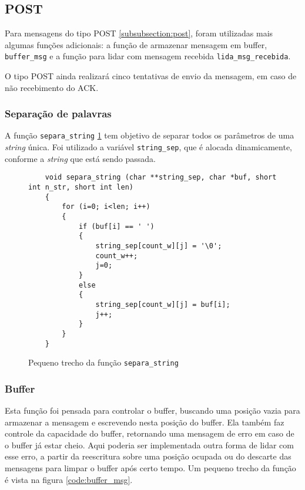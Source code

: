 \subsection{POST}

Para mensagens do tipo POST \ref{subsubsection:post}, foram utilizadas mais algumas funções adicionais: a  função de armazenar mensagem em buffer, \texttt{buffer\_msg} e a função para lidar com mensagem recebida \texttt{lida\_msg\_recebida}.

O tipo POST ainda realizará cinco tentativas de envio da mensagem, em caso de não recebimento do ACK.

\subsubsection{Separação de palavras}
A função \texttt{separa\_string} \ref{code:separa_string} tem objetivo de separar todos os parâmetros de uma \textit{string} única. Foi utilizado a variável \texttt{string\_sep}, que é alocada dinamicamente, conforme a \textit{string} que está sendo passada.

\begin{figure}[!htb]
	\begin{lstlisting}
	void separa_string (char **string_sep, char *buf, short int n_str, short int len)
	{
		for (i=0; i<len; i++)
		{
			if (buf[i] == ' ')
			{			
				string_sep[count_w][j] = '\0';
				count_w++;
				j=0;
			}
			else
			{
				string_sep[count_w][j] = buf[i];
				j++;
			}
		}
	}
	\end{lstlisting}
	\caption{Pequeno trecho da função \texttt{separa\_string}}
	\label{code:separa_string}
\end{figure}


\subsubsection{Buffer}

Esta função foi pensada para controlar o buffer, buscando uma posição vazia para armazenar a mensagem e escrevendo nesta posição do buffer. Ela também faz controle da capacidade do buffer, retornando uma mensagem de erro em caso de o buffer já estar cheio. Aqui poderia ser implementada outra forma de lidar com esse erro, a partir da reescritura sobre uma posição ocupada ou do descarte das mensagens para limpar o buffer após certo tempo. Um pequeno trecho da função é vista na figura \ref{code:buffer_msg}.

